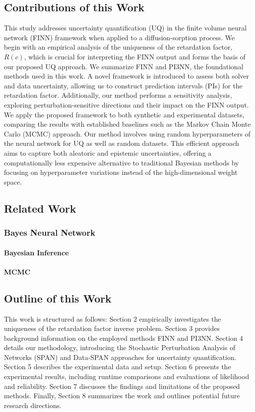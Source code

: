 \subsection{Contributions of this Work}
This study addresses uncertainty quantification (UQ) in the finite volume neural network (FINN) framework when applied to a diffusion-sorption process. We begin with an empirical analysis of the uniqueness of the retardation factor, $R(c)$, which is crucial for interpreting the FINN output and forms the basis of our proposed UQ approach. We summarize FINN and PI3NN, the foundational methods used in this work. A novel framework is introduced to assess both solver and data uncertainty, allowing us to construct prediction intervals (PIs) for the retardation factor. Additionally, our method performs a sensitivity analysis, exploring perturbation-sensitive directions and their impact on the FINN output. We apply the proposed framework to both synthetic and experimental datasets, comparing the results with established baselines such as the Markov Chain Monte Carlo (MCMC) approach. Our method involves using random hyperparameters of the neural network for UQ as well as random datasets. This efficient approach aims to capture both aleatoric and epistemic uncertainties, offering a computationally less expensive alternative to traditional Bayesian methods by focusing on hyperparameter variations instead of the high-dimensional weight space. %


\subsection{Related Work}
\subsubsection{Bayes Neural Network}
\paragraph{Bayesian Inference}
\paragraph{MCMC}


\subsection{Outline of this Work}
This work is structured as follows: Section 2 empirically investigates the uniqueness of the retardation factor inverse problem. Section 3 provides background information on the employed methods FINN and PI3NN. Section 4 details our methodology, introducing the Stochastic Perturbation Analysis of Networks (SPAN) and Data-SPAN approaches for uncertainty quantification. Section 5 describes the experimental data and setup. Section 6 presents the experimental results, including runtime comparisons and evaluations of likelihood and reliability. Section 7 discusses the findings and limitations of the proposed methods. Finally, Section 8 summarizes the work and outlines potential future research directions.



